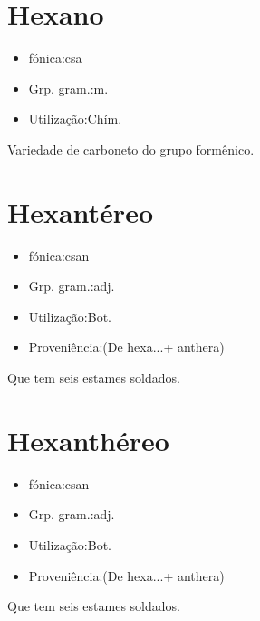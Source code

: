 \documentclass{article}
\begin{document}
\section{Hexano}
\begin{itemize}
\item {fónica:csa}
\end{itemize}
\begin{itemize}
\item {Grp. gram.:m.}
\end{itemize}
\begin{itemize}
\item {Utilização:Chím.}
\end{itemize}
Variedade de carboneto do grupo formênico.
\section{Hexantéreo}
\begin{itemize}
\item {fónica:csan}
\end{itemize}
\begin{itemize}
\item {Grp. gram.:adj.}
\end{itemize}
\begin{itemize}
\item {Utilização:Bot.}
\end{itemize}
\begin{itemize}
\item {Proveniência:(De \textunderscore hexa...\textunderscore  + \textunderscore anthera\textunderscore )}
\end{itemize}
Que tem seis estames soldados.
\section{Hexanthéreo}
\begin{itemize}
\item {fónica:csan}
\end{itemize}
\begin{itemize}
\item {Grp. gram.:adj.}
\end{itemize}
\begin{itemize}
\item {Utilização:Bot.}
\end{itemize}
\begin{itemize}
\item {Proveniência:(De \textunderscore hexa...\textunderscore  + \textunderscore anthera\textunderscore )}
\end{itemize}
Que tem seis estames soldados.
\end{document}
